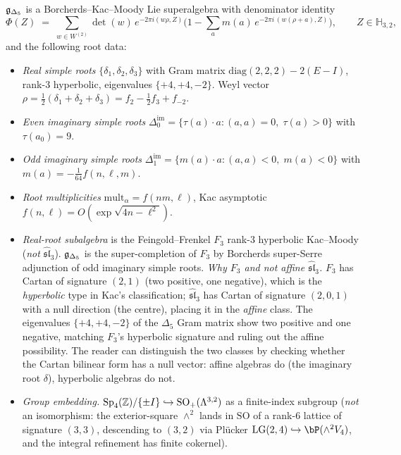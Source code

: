 \begin{theorem}
\label{wn:thm:spine-gDelta5}
$\mathfrak{g}_{\Delta_5}$ is a Borcherds--Kac--Moody Lie superalgebra with
denominator identity
\[
\Phi(Z) \;=\; \sum_{w \in W^{(2)}} \det(w)\,
e^{-2\pi i (w\rho, Z)}
\biggl(1 - \sum_a m(a)\, e^{-2\pi i\, (w(\rho + a), Z)}\biggr),
\qquad
Z \in \mathbb{H}_{3,2},
\]
and the following root data:
\begin{itemize}
\item \emph{Real simple roots} $\{\delta_1, \delta_2, \delta_3\}$ with
Gram matrix $\mathrm{diag}(2,2,2) - 2(E - I)$, rank-$3$ hyperbolic,
eigenvalues $\{+4, +4, -2\}$. Weyl vector
$\rho = \tfrac{1}{2}(\delta_1 + \delta_2 + \delta_3)
= f_2 - \tfrac{1}{2}f_3 + f_{-2}$.
\item \emph{Even imaginary simple roots}
$\Delta^{\mathrm{im}}_0 = \{\tau(a) \cdot a :
(a, a) = 0,\; \tau(a) > 0\}$ with $\tau(a_0) = 9$.
\item \emph{Odd imaginary simple roots}
$\Delta^{\mathrm{im}}_1 = \{m(a) \cdot a :
(a, a) < 0,\; m(a) < 0\}$
with $m(a) = -\tfrac{1}{64} f(n, \ell, m)$.
\item \emph{Root multiplicities} $\mathrm{mult}_\alpha = f(nm, \ell)$,
Kac asymptotic $f(n, \ell) = O(\exp \sqrt{4n - \ell^2})$.
\item \emph{Real-root subalgebra} is the Feingold--Frenkel $F_3$
rank-$3$ hyperbolic Kac--Moody (\emph{not} $\widehat{\mathfrak{sl}}_3$).
$\mathfrak{g}_{\Delta_5}$ is the super-completion of $F_3$ by Borcherds
super-Serre adjunction of odd imaginary simple roots. \emph{Why $F_3$
and not affine $\widehat{\mathfrak{sl}}_3$.} $F_3$ has Cartan of
signature $(2, 1)$ (two positive, one negative), which is the
\emph{hyperbolic} type in Kac's classification; $\widehat{\mathfrak{sl}}_3$
has Cartan of signature $(2, 0, 1)$ with a null direction (the
centre), placing it in the \emph{affine} class. The eigenvalues
$\{+4, +4, -2\}$ of the $\Delta_5$ Gram matrix show two positive and
one negative, matching $F_3$'s hyperbolic signature and ruling out
the affine possibility. The reader can distinguish the two classes
by checking whether the Cartan bilinear form has a null vector:
affine algebras do (the imaginary root $\delta$), hyperbolic
algebras do not.
\item \emph{Group embedding.}
$\mathrm{Sp}_4(\mathbb{Z})/\{\pm I\} \hookrightarrow \mathrm{SO}_+(\Lambda^{3,2})$ as a
finite-index subgroup (\emph{not} an isomorphism: the exterior-square
$\wedge^2$ lands in $\mathrm{SO}$ of a rank-$6$ lattice of signature
$(3,3)$, descending to $(3,2)$ via Pl\"ucker $\mathrm{LG}(2,4)
\hookrightarrow \bP(\wedge^2 V_4)$, and the integral refinement has
finite cokernel).
\end{itemize}
\end{theorem}

